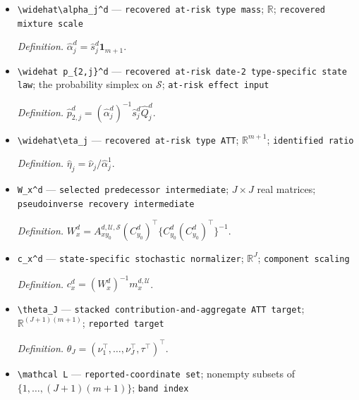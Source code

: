 \documentclass{article}
\begin{document}
\begin{itemize}
  \par\smallskip\noindent\emph{Definition.} \(\widehat\nu_j=\widehat s_j^1\widehat Q_j^1(\widehat R_j^1-\widehat R_j^0)\).
  \item \texttt{\textbackslash{}\allowbreak{}widehat\textbackslash{}\allowbreak{}alpha\_\allowbreak{}j\textasciicircum{}d} --- \texttt{recovered at-\allowbreak{}risk type mass}; \(\mathbb R\); \texttt{recovered mixture scale}
  \par\smallskip\noindent\emph{Definition.} \(\widehat\alpha_j^d=\widehat s_j^d\mathbf 1_{m+1}\).
  \item \texttt{\textbackslash{}\allowbreak{}widehat p\_\allowbreak{}\{2,\allowbreak{}j\}\allowbreak{}\textasciicircum{}d} --- \texttt{recovered at-\allowbreak{}risk date-\allowbreak{}2 type-\allowbreak{}specific state law}; the probability simplex on \(\mathcal S\); \texttt{at-\allowbreak{}risk effect input}
  \par\smallskip\noindent\emph{Definition.} \(\widehat p_{2,j}^d=(\widehat\alpha_j^d)^{-1}\widehat s_j^d\widehat Q_j^d\).
  \item \texttt{\textbackslash{}\allowbreak{}widehat\textbackslash{}\allowbreak{}eta\_\allowbreak{}j} --- \texttt{recovered at-\allowbreak{}risk type ATT}; \(\mathbb R^{m+1}\); \texttt{identified ratio}
  \par\smallskip\noindent\emph{Definition.} \(\widehat\eta_j=\widehat\nu_j/\widehat\alpha_j^1\).
  \item \texttt{W\_\allowbreak{}x\textasciicircum{}d} --- \texttt{selected predecessor intermediate}; \(J\times J\) real matrices; \texttt{pseudoinverse recovery intermediate}
  \par\smallskip\noindent\emph{Definition.} \(W_x^d=A_{xy_0}^{d,\mathcal U,\mathcal S}(C_{y_0}^d)^\top\{C_{y_0}^d(C_{y_0}^d)^\top\}^{-1}\).
  \item \texttt{c\_\allowbreak{}x\textasciicircum{}d} --- \texttt{state-\allowbreak{}specific stochastic normalizer}; \(\mathbb R^J\); \texttt{component scaling}
  \par\smallskip\noindent\emph{Definition.} \(c_x^d=(W_x^d)^{-1}m_x^{d,\mathcal U}\).
  \item \texttt{\textbackslash{}\allowbreak{}theta\_\allowbreak{}J} --- \texttt{stacked contribution-\allowbreak{}and-\allowbreak{}aggregate ATT target}; \(\mathbb R^{(J+1)(m+1)}\); \texttt{reported target}
  \par\smallskip\noindent\emph{Definition.} \(\theta_J=(\nu_1^\top,\ldots,\nu_J^\top,\tau^\top)^\top\).
  \item \texttt{\textbackslash{}\allowbreak{}mathcal L} --- \texttt{reported-\allowbreak{}coordinate set}; nonempty subsets of \(\{1,\ldots,(J+1)(m+1)\}\); \texttt{band index}

\end{itemize}
\end{document}
